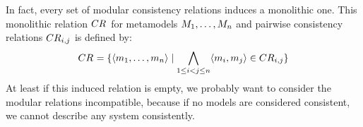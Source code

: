 In fact, every set of modular consistency relations induces a monolithic one.
This monolithic relation $\consistencyrelation{CR}{}$ for metamodels $\metamodelsequence{M}{n}$ and pairwise consistency relations $\consistencyrelation{CR}{i,j}$ is defined by:
\begin{align*}
    \consistencyrelation{CR}{} = \setted{\tupled{\model{m}{1}, \dots, \model{m}{n}} \mid \bigwedge\limits_{1 \le i < j \le n} \tupled{\model{m}{i}, \model{m}{j}} \in \consistencyrelation{CR}{i,j}}
\end{align*}
At least if this induced relation is empty, we probably want to consider the modular relations incompatible, because if no models are considered consistent, we cannot describe any system consistently.





